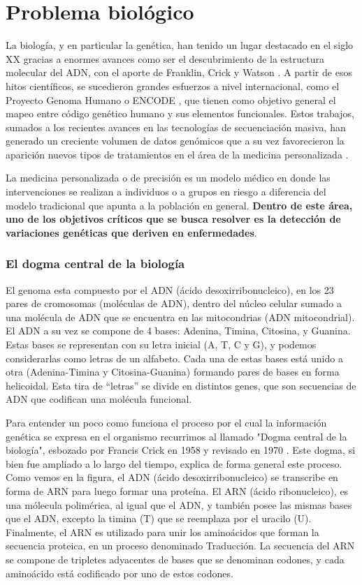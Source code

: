 \section{Problema biológico}

La biología, y en particular la genética, han tenido un lugar destacado en el siglo XX gracias a enormes avances como ser el descubrimiento de la estructura molecular del ADN, con el aporte de Franklin, Crick y Watson \cite{WATSON1953}. A partir de esos hitos científicos, se sucedieron grandes esfuerzos a nivel internacional, como el Proyecto Genoma Humano \cite{Consortium2001} o ENCODE \cite{Consortium2012}, que tienen como objetivo general el mapeo entre código genético humano y sus elementos funcionales. Estos trabajos, sumados a los recientes avances en las tecnologías de secuenciación masiva, han generado un creciente volumen de datos genómicos que a su vez favorecieron la aparición nuevos tipos de tratamientos en el área de la medicina personalizada \cite{doi:10.1056/NEJMp1006304}. 

La medicina personalizada o de precisión es un modelo médico en donde las intervenciones se realizan a individuos o a grupos en riesgo a diferencia del modelo tradicional que apunta a la población en general. \textbf{Dentro de este área, uno de los objetivos críticos que se busca resolver es la detección de variaciones genéticas que deriven en enfermedades}.

\subsubsection{El dogma central de la biología}

El genoma esta compuesto por el ADN (ácido desoxirribonucleico), en los 23 pares de cromosomas (moléculas de ADN), dentro del núcleo celular sumado a una molécula de ADN que se encuentra en las mitocondrias (ADN mitocondrial). El ADN a su vez se compone de 4 bases: Adenina, Timina, Citosina, y Guanina. Estas bases se representan con su letra inicial (A, T, C y G), y podemos considerarlas como letras de un alfabeto. Cada una de estas bases está unido a otra (Adenina-Timina y Citosina-Guanina) formando pares de bases en forma helicoidal. Esta tira de ``letras'' se divide en distintos genes, que son secuencias de ADN que codifican una molécula funcional.

Para entender un poco como funciona el proceso por el cual la información genética se expresa en el organismo recurrimos al llamado "Dogma central de la biología", esbozado por Francis Crick en 1958 y revisado en 1970 \cite{CRICK1970}. Este dogma, si bien fue ampliado a lo largo del tiempo, explica de forma general este proceso. Como vemos en la figura, el ADN (ácido desoxirribonucleico) se transcribe en forma de ARN para luego formar una proteína. El ARN (ácido ribonucleico), es una mólecula polimérica, al igual que el ADN, y también posee las mismas bases que el ADN, excepto la timina (T) que se reemplaza por el uracilo (U). Finalmente, el ARN es utilizado para unir los aminoácidos que forman la secuencia proteica, en un proceso denominado Traducción. La secuencia del ARN se compone de tripletes adyacentes de bases que se denominan codones, y cada aminoácido está codificado por uno de estos codones. 


